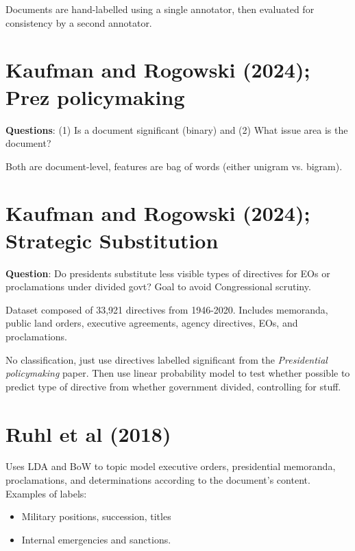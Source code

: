 \documentclass[letterpaper, justified, notitlepage]{tufte-handout}
\theoremstyle{plain}
\begin{document}
Documents are hand-labelled using a single annotator, then evaluated for consistency by a second
annotator.

\section{Kaufman and Rogowski (2024); Prez policymaking}
\textbf{Questions}: (1) Is a document significant (binary) and (2) What issue area is the document?

Both are document-level, features are bag of words (either unigram vs. bigram).


\section{Kaufman and Rogowski (2024); Strategic Substitution}
\textbf{Question}: Do presidents substitute less visible types of directives for EOs or
proclamations under divided govt? Goal to avoid Congressional scrutiny.

Dataset composed of 33,921 directives from 1946-2020. Includes memoranda, public land orders,
executive agreements, agency directives, EOs, and proclamations. 

No classification, just use directives labelled significant from the \textit{Presidential
policymaking} paper. Then use linear probability model to test whether possible to predict type of
directive from whether government divided, controlling for stuff. 

\section{Ruhl et al (2018)}
Uses LDA and BoW to topic model executive orders, presidential memoranda, proclamations, and
determinations according to the document's content. Examples of labels:
\begin{itemize}
  \item Military positions, succession, titles
  \item Internal emergencies and sanctions.
\end{itemize}
\end{document}
